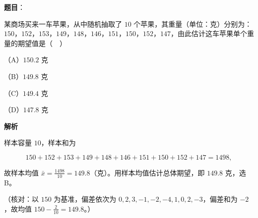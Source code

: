 \begin{answer}

\textbf{题目}：

某商场买来一车苹果，从中随机抽取了 $10$ 个苹果，其重量（单位：克）分别为：$150$，$152$，$153$，$149$，$148$，$146$，$151$，$150$，$152$，$147$，由此估计这车苹果单个重量的期望值是（　）

（A）$150.2$ 克

（B）$149.8$ 克

（C）$149.4$ 克

（D）$147.8$ 克

\textbf{解析}

样本容量 $10$，样本和为

\nopagebreak[4]
\[150+152+153+149+148+146+151+150+152+147=1498,\]

故样本均值 $\bar x=\frac{1498}{10}=149.8$（克）。用样本均值估计总体期望，即 $149.8$ 克，选 B。

（核对：以 $150$ 为基准，偏差依次为 $0,2,3,-1,-2,-4,1,0,2,-3$，偏差和为 $-2$，故均值 $150-\frac{2}{10}=149.8$。）


\end{answer}
